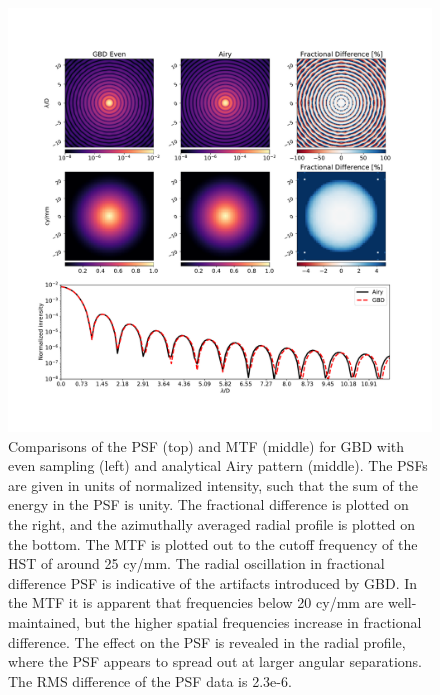 \begin{figure}[H]
    \centering
    \includegraphics[width=\textwidth]{Airy_compare_Even.pdf}
    \caption{Comparisons of the PSF (top) and MTF (middle) for GBD with even sampling (left) and analytical Airy pattern (middle). The PSFs are given in units of normalized intensity, such that the sum of the energy in the PSF is unity. The fractional difference is plotted on the right, and the azimuthally averaged radial profile is plotted on the bottom. The MTF is plotted out to the cutoff frequency of the HST of around 25 cy/mm. The radial oscillation in  fractional difference PSF is indicative of the artifacts introduced by GBD. In the MTF it is apparent that frequencies below 20 cy/mm are well-maintained, but the higher spatial frequencies increase in fractional difference. The effect on the PSF is revealed in the radial profile, where the PSF appears to spread out at larger angular separations. The RMS difference of the PSF data is 2.3e-6.}
    \label{fig:airy_even}
\end{figure}

